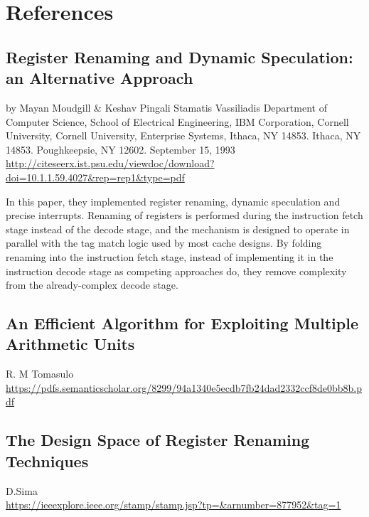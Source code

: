 \chapter{References}

\section{Register Renaming and Dynamic Speculation: an Alternative Approach}
by Mayan Moudgill \& Keshav Pingali Stamatis Vassiliadis Department of Computer Science, School of Electrical Engineering, IBM Corporation, Cornell University, Cornell University, Enterprise Systems, Ithaca, NY 14853. Ithaca, NY 14853. Poughkeepsie, NY 12602. September 15, 1993\\
\url{http://citeseerx.ist.psu.edu/viewdoc/download?doi=10.1.1.59.4027&rep=rep1&type=pdf}

In this paper, they implemented register renaming, dynamic speculation and precise interrupts. Renaming of registers is performed during the instruction fetch stage instead of the decode stage, and the mechanism is designed to operate in parallel with the tag match logic used by most cache designs. By folding renaming into the instruction fetch stage, instead of implementing it in the instruction decode stage as competing approaches do, they remove complexity from the already-complex decode stage. 

\section{An Efficient Algorithm for Exploiting Multiple Arithmetic Units}
R. M Tomasulo\\
\url{https://pdfs.semanticscholar.org/8299/94a1340e5ecdb7fb24dad2332ccf8de0bb8b.pdf}

\section{The Design Space of Register Renaming Techniques}
D.Sima\\
\url{https://ieeexplore.ieee.org/stamp/stamp.jsp?tp=&arnumber=877952&tag=1}